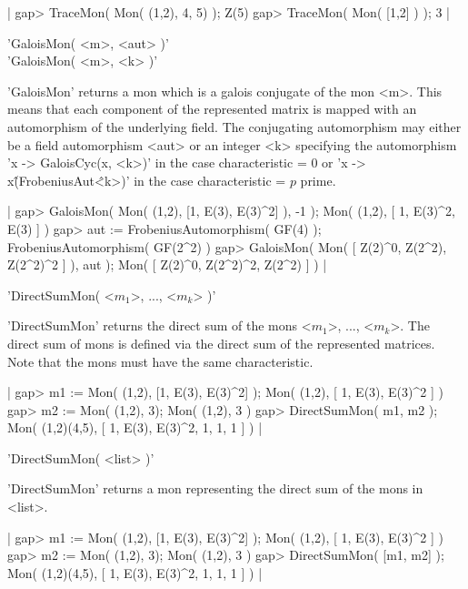 |    gap> TraceMon( Mon( (1,2), 4, 5) );
    Z(5)
    gap> TraceMon( Mon( [1,2] ) );
    3 |


'GaloisMon( <m>, <aut> )'\\
'GaloisMon( <m>, <k> )'

'GaloisMon' returns a mon which is a galois conjugate of the mon <m>. 
This means that each component of the represented matrix is mapped
with an automorphism of the underlying field.
The conjugating automorphism may either be a field automorphism <aut>
or an integer <k> specifying the automorphism 'x -> GaloisCyc(x, <k>)'
in the case characteristic = 0 or 'x -> x\^(FrobeniusAut\^<k>)' in the
case characteristic = $p$ prime.

|    gap> GaloisMon( Mon( (1,2), [1, E(3), E(3)^2] ), -1 );
    Mon(
      (1,2),
      [ 1, E(3)^2, E(3) ]
    )
    gap> aut := FrobeniusAutomorphism( GF(4) );
    FrobeniusAutomorphism( GF(2^2) )
    gap> GaloisMon( Mon( [ Z(2)^0, Z(2^2), Z(2^2)^2 ] ), aut );
    Mon( [ Z(2)^0, Z(2^2)^2, Z(2^2) ] ) |


'DirectSumMon( <$m_1$>, ..., <$m_k$> )'

'DirectSumMon' returns the direct sum of the mons 
<$m_1$>, ..., <$m_k$>. The direct sum of mons is defined via
the direct sum of the represented matrices. 
Note that the mons must have the same characteristic.

|    gap> m1 := Mon( (1,2), [1, E(3), E(3)^2] );
    Mon(
      (1,2),
      [ 1, E(3), E(3)^2 ]
    )
    gap> m2 := Mon( (1,2), 3);
    Mon( (1,2), 3 )
    gap> DirectSumMon( m1, m2 );
    Mon(
      (1,2)(4,5),
      [ 1, E(3), E(3)^2, 1, 1, 1 ]
    ) |

'DirectSumMon( <list> )'

'DirectSumMon' returns a mon representing the direct sum of the mons
in <list>.

|    gap> m1 := Mon( (1,2), [1, E(3), E(3)^2] );
    Mon(
      (1,2),
      [ 1, E(3), E(3)^2 ]
    )
    gap> m2 := Mon( (1,2), 3);
    Mon( (1,2), 3 )
    gap> DirectSumMon( [m1, m2] );
    Mon(
      (1,2)(4,5),
      [ 1, E(3), E(3)^2, 1, 1, 1 ]
    ) |


